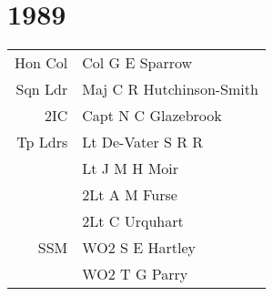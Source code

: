 \chapter*{1989}

\begin{center}
  \small
  \begin{tabular}{rl}
    Hon Col & Col G E Sparrow \\
    Sqn Ldr & Maj C R Hutchinson-Smith \\
    2IC & Capt N C Glazebrook \\
    Tp Ldrs & Lt De-Vater S R R \\
      & Lt J M H Moir \\
      & 2Lt A M Furse \\
      & 2Lt C Urquhart \\
    SSM & WO2 S E Hartley \\
      & WO2 T G Parry \\
  \end{tabular}
\end{center}

